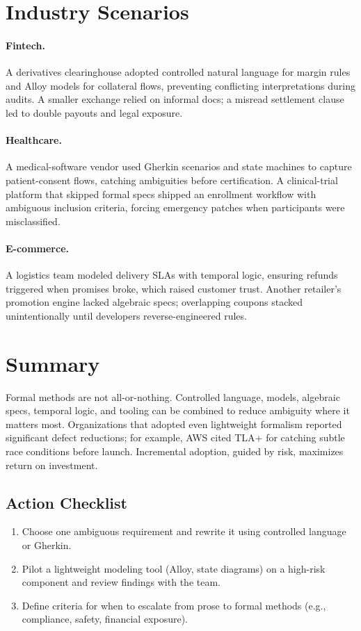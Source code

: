\section{Industry Scenarios}
\label{sec:formal-examples}

\paragraph{Fintech.} A derivatives clearinghouse adopted controlled natural language for margin rules and Alloy models for collateral flows, preventing conflicting interpretations during audits. A smaller exchange relied on informal docs; a misread settlement clause led to double payouts and legal exposure.

\paragraph{Healthcare.} A medical-software vendor used Gherkin scenarios and state machines to capture patient-consent flows, catching ambiguities before certification. A clinical-trial platform that skipped formal specs shipped an enrollment workflow with ambiguous inclusion criteria, forcing emergency patches when participants were misclassified.

\paragraph{E-commerce.} A logistics team modeled delivery SLAs with temporal logic, ensuring refunds triggered when promises broke, which raised customer trust. Another retailer’s promotion engine lacked algebraic specs; overlapping coupons stacked unintentionally until developers reverse-engineered rules.

\section{Summary}
\label{sec:formal-summary}

Formal methods are not all-or-nothing. Controlled language, models, algebraic specs, temporal logic, and tooling can be combined to reduce ambiguity where it matters most. Organizations that adopted even lightweight formalism reported significant defect reductions; for example, AWS cited TLA+ for catching subtle race conditions before launch. Incremental adoption, guided by risk, maximizes return on investment.

\subsection{Action Checklist}
\begin{enumerate}
    \item Choose one ambiguous requirement and rewrite it using controlled language or Gherkin.
    \item Pilot a lightweight modeling tool (Alloy, state diagrams) on a high-risk component and review findings with the team.
    \item Define criteria for when to escalate from prose to formal methods (e.g., compliance, safety, financial exposure).
\end{enumerate}

